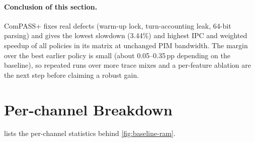 \documentclass[conference]{IEEEtran}
\begin{document}
\paragraph{Conclusion of this section.} ComPASS+ fixes real defects (warm-up lock, turn-accounting leak, 64-bit parsing) and gives the lowest slowdown (3.44\%) and highest IPC and weighted speedup of all policies in its matrix at unchanged PIM bandwidth. The margin over the best earlier policy is small (about 0.05--0.35\,pp depending on the baseline), so repeated runs over more trace mixes and a per-feature ablation are the next step before claiming a robust gain.

\appendices
\section{Per-channel Breakdown}\label{app:channel}
 lists the per-channel statistics behind \cref{fig:baseline-ram}.
\end{document}
